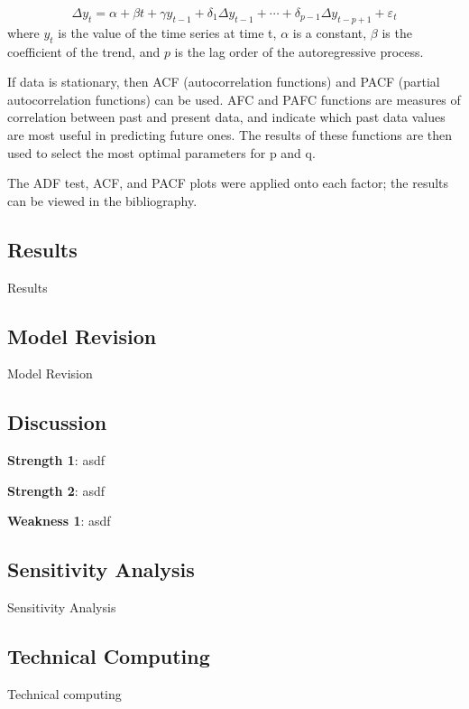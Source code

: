 \begin{equation}
    \Delta y_{t}=\alpha +\beta t+\gamma y_{t-1}+\delta _{1}\Delta y_{t-1}+\cdots +\delta _{p-1}\Delta y_{t-p+1}+\varepsilon _{t}
\end{equation}
%
where
${y_{t}}$ is the value of the time series at time t,
${\alpha}$ is a constant,
${\beta}$ is the coefficient of the trend, and
$p$ is the lag order of the autoregressive process.

If data is stationary, then ACF (autocorrelation functions) and PACF (partial autocorrelation functions) can be used.
AFC and PAFC functions are measures of correlation between past
and present data, and indicate which past data values are most useful in predicting future
ones. The results of these functions are then used to select the most optimal parameters for
p and q.

The ADF test, ACF, and PACF plots were applied onto each factor; the results can be viewed in the bibliography.


\subsection{Results}
Results

\subsection{Model Revision}
Model Revision

\subsection{Discussion}

\noindent\textbf{Strength 1}: asdf

\noindent\textbf{Strength 2}: asdf

\noindent\textbf{Weakness 1}: asdf

\subsection{Sensitivity Analysis}
Sensitivity Analysis

\subsection{Technical Computing}
Technical computing
